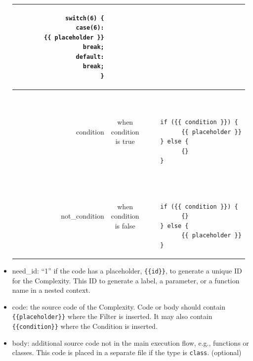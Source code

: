\documentclass[12pt]{article}
\begin{document}
\begin{itemize}
\begin{table}[H]
\begin{tabular}{|r|c|l|}
\begin{minipage}{3in}
\begin{verbatim}
    switch(6) {
      case(6):
        {{ placeholder }}
        break;
      default:
        break;
    }
    \end{verbatim}
    \end{minipage}
    \\
    \hline
    condition &
    \makecell{when \\ condition \\ is true} &
    \begin{minipage}{3in}
    \begin{verbatim}


    if ({{ condition }}) {
          {{ placeholder }}
    } else {
          {}
    }
    \end{verbatim}
    \end{minipage}
    \\
    \hline
    not\_condition &
    \makecell{when \\ condition \\ is false} &
    \begin{minipage}{3in}
    \begin{verbatim}


    if ({{ condition }}) {
          {}
    } else {
          {{ placeholder }}
    }
    \end{verbatim}
    \end{minipage}
    \\
    \hline
    \end{tabular}
    \label{tab:execution examples}
    \end{table}

    \item need\_id: ``1'' if the code has a placeholder, \verb|{{id}}|,
    to generate a unique ID for the Complexity.  This ID to generate 
    a label, a parameter, or a function name in a nested
    context.

    \item code: the source code of the Complexity.  Code or 
    body should contain \\ \verb|{{placeholder}}|
    where the Filter is inserted.  It may also contain
    \verb|{{condition}}| where the Condition
    is inserted.

    \item body: additional source code not in the main execution flow,
    e.g., functions or classes.  This code is placed in a separate file
    if the type is \verb|class|. (optional)
\end{itemize}
\end{document}
